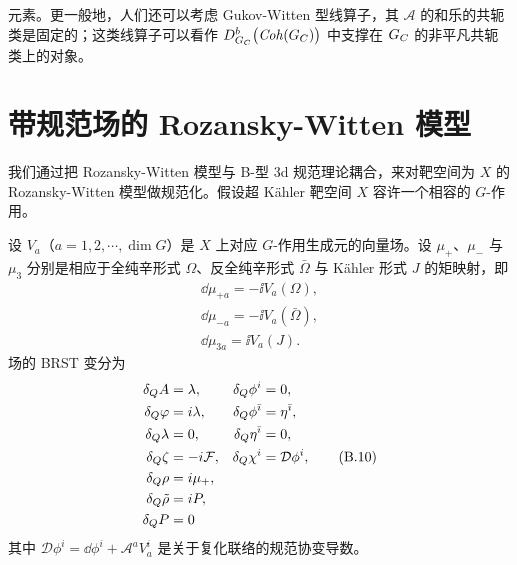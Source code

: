 

元素。更一般地，人们还可以考虑 Gukov-Witten 型线算子，其 $\mathcal{A}$ 的和乐的共轭类是固定的；这类线算子可以看作 $D^b_{G_C}\big(\mathit{Coh}(G_C)\big)$ 中支撑在 $G_C$ 的非平凡共轭类上的对象。

\section{带规范场的 Rozansky-Witten 模型}

我们通过把 Rozansky-Witten 模型与 B-型 3d 规范理论耦合，来对靶空间为 $X$ 的 Rozansky-Witten 模型做规范化。假设超 Kähler 靶空间 $X$ 容许一个相容的 $G$-作用。

设 $V_a$（$a=1,2,\cdots,\dim G$）是 $X$ 上对应 $G$-作用生成元的向量场。设 $\mu_+$、$\mu_-$ 与 $\mu_3$ 分别是相应于全纯辛形式 $\Omega$、反全纯辛形式 $\bar\Omega$ 与 Kähler 形式 $J$ 的矩映射，即
\begin{gather*}
  \dd\mu_{+a}=-\ii V_a(\Omega),\\
  \dd\mu_{-a}=-\ii V_a(\bar\Omega),\\
  \dd\mu_{3a}=\ii V_a(J).
\end{gather*}
场的 BRST 变分为
\begin{align}
  \delta_QA &= \lambda, & \delta_Q\phi^i &= 0, \notag\\
  \delta_Q\varphi &= i\lambda, & \delta_Q\phi^{\bar\imath} &= \eta^{\bar\imath}, \notag\\
  \delta_Q\lambda &= 0, & \delta_Q\eta^{\bar\imath} &= 0, \notag\\
  \delta_Q\zeta &= -i\mathcal{F}, & \delta_Q\chi^i &= \mathcal{D}\phi^i, \tag{B.10}\\
  \delta_Q\rho &= i\mu_+, \notag\\
  \delta_Q\tilde\rho &= i P, \notag\\
  \delta_QP &= 0 \notag
\end{align}
其中 $\mathcal{D}\phi^i=\dd\phi^i+\mathcal{A}^aV^i_a$ 是关于复化联络的规范协变导数。

